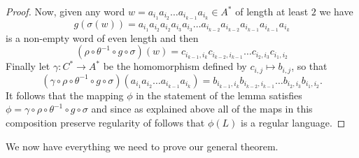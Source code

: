 \documentclass{amsart}
\theoremstyle{plain}
\theoremstyle{definition}
\begin{document}
\begin{proof}
Now, given any word 
$w = a_{i_1} a_{i_2} \ldots a_{i_{k-1}} a_{i_k}\in A^*$ of length at least $2$ we have 
\[
g(\sigma(w)) = 
a_{i_1} 
a_{i_2} 
a_{i_2} 
a_{i_3} 
a_{i_3} 
\ldots
a_{i_{k-2}} 
a_{i_{k-2}} 
a_{i_{k-1}} 
a_{i_{k-1}} 
a_{i_k}
\]
is a non-empty word of even length and then 
\[
(\rho \circ \theta^{-1} \circ g \circ \sigma)(w) = 
c_{i_{k-1},i_k} 
c_{i_{k-2},i_{k-1}} 
\ldots 
c_{i_2,i_3} 
c_{i_1,i_2} 
\] 
Finally let $\gamma:C^* \rightarrow A^*$ be the homomorphism defined by $c_{i,j} \mapsto b_{i,j}$, so that  
\[
(\gamma \circ \rho \circ \theta^{-1} \circ g \circ \sigma) (a_{i_1} a_{i_2} \ldots a_{i_{k-1}} a_{i_k}) = 
b_{i_{k-1},i_k} 
b_{i_{k-2},i_{k-1}} 
\ldots 
b_{i_2,i_3} 
b_{i_1,i_2}.  
\]
It follows that the mapping $\phi$ in the statement of the lemma satisfies  
$\phi = \gamma \circ \rho \circ \theta^{-1} \circ g \circ \sigma$ and  
since as explained above all of the maps in this composition preserve regularity of follows that $\phi(L)$ is a regular language.    
  \end{proof}

We now have everything we need to prove our general theorem. 
\end{document}
